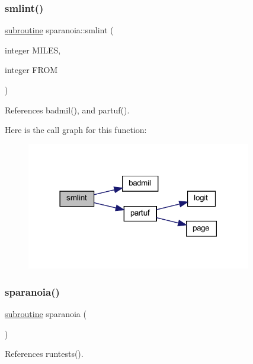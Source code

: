 \subsubsection{\texorpdfstring{smlint()}{smlint()}}
{\footnotesize\ttfamily \hyperlink{M__stopwatch_83_8txt_acfbcff50169d691ff02d4a123ed70482}{subroutine} sparanoia\+::smlint (\begin{DoxyParamCaption}\item[{integer}]{M\+I\+L\+ES,  }\item[{integer}]{F\+R\+OM }\end{DoxyParamCaption})}



References badmil(), and partuf().

Here is the call graph for this function\+:
\nopagebreak
\begin{figure}[H]
\begin{center}
\leavevmode
\includegraphics[width=278pt]{sparanoia_8f90_a6d17020aa087d1f751f1f0bfcf473d27_cgraph}
\end{center}
\end{figure}
\mbox{\label{sparanoia_8f90_a3924a135a277ffc4f0b2271ccde40373}} 
\subsubsection{\texorpdfstring{sparanoia()}{sparanoia()}}
{\footnotesize\ttfamily \hyperlink{M__stopwatch_83_8txt_acfbcff50169d691ff02d4a123ed70482}{subroutine} sparanoia (\begin{DoxyParamCaption}{ }\end{DoxyParamCaption})}



References runtests().

